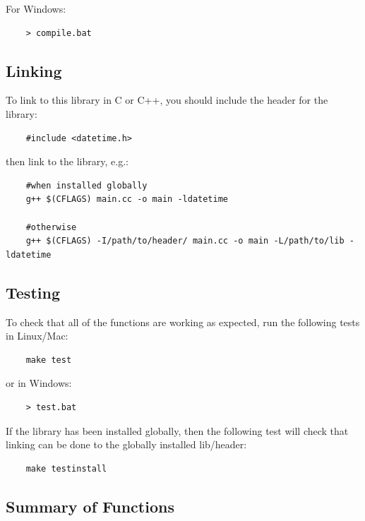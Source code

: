 	For Windows:
	\begin{verbatim}
	> compile.bat
	\end{verbatim}
	
	\subsection{Linking}
	
	To link to this library in C or C++, you should include the header for the library:
	
	\begin{verbatim}
	#include <datetime.h>
	\end{verbatim}
	
	then link to the library, e.g.:
	
	\begin{verbatim}
	#when installed globally
	g++ $(CFLAGS) main.cc -o main -ldatetime
	
	#otherwise
	g++ $(CFLAGS) -I/path/to/header/ main.cc -o main -L/path/to/lib -ldatetime
	\end{verbatim}
	
	\subsection{Testing}
	
	To check that all of the functions are working as expected, run the following tests in Linux/Mac:
	
	\begin{verbatim}
	make test
	\end{verbatim}
	
	or in Windows:
	
	\begin{verbatim}
	> test.bat
	\end{verbatim}
	
	If the library has been installed globally, then the following test will check that linking can be done to the globally installed lib/header:
	
	\begin{verbatim}
	make testinstall
	\end{verbatim}
	
	\subsection{Summary of Functions}
	
